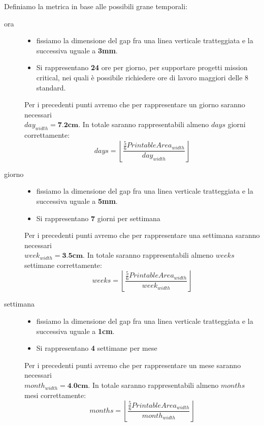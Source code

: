 Definiamo la metrica in base alle possibili grane temporali:
\begin{description}
\item[ora] \quad
\begin{itemize}
  \item fissiamo la dimensione del gap fra una linea verticale tratteggiata
e la successiva uguale a \textbf{3mm}.
  \item Si rappresentano \textbf{24} ore per giorno, per supportare progetti
  mission critical, nei quali \`e possibile richiedere ore di lavoro maggiori delle 8 
standard.
\end{itemize}

Per i precedenti punti avremo che per rappresentare un giorno saranno
necessari\\ $day_{width} = \textbf{7.2cm}$. In totale saranno rappresentabili 
almeno $days$ giorni correttamente:
\begin{displaymath}
	days = \left \lfloor \frac{\frac{5}{6}PrintableArea_{width}
	}{day_{width}}\right \rfloor
\end{displaymath}


\item[giorno] \quad
\begin{itemize}
  \item fissiamo la dimensione del gap fra una linea verticale tratteggiata
e la successiva uguale a \textbf{5mm}.
  \item Si rappresentano \textbf{7} giorni per settimana
\end{itemize}

Per i precedenti punti avremo che per rappresentare una settimana saranno
necessari\\ $week_{width} = \textbf{3.5cm}$. In totale saranno rappresentabili 
almeno $weeks$ settimane correttamente:
\begin{displaymath}
	weeks = \left \lfloor \frac{\frac{5}{6}PrintableArea_{width}
	}{week_{width}}\right \rfloor
\end{displaymath}


\item[settimana] \quad
\begin{itemize}
  \item fissiamo la dimensione del gap fra una linea verticale tratteggiata
e la successiva uguale a \textbf{1cm}.
  \item Si rappresentano \textbf{4} settimane per mese
\end{itemize}

Per i precedenti punti avremo che per rappresentare un mese saranno
necessari\\ $month_{width} = \textbf{4.0cm}$. In totale saranno rappresentabili 
almeno $months$ mesi correttamente:
\begin{displaymath}
	months = \left \lfloor \frac{\frac{5}{6}PrintableArea_{width}
	}{month_{width}}\right \rfloor
\end{displaymath}



\end{description}
